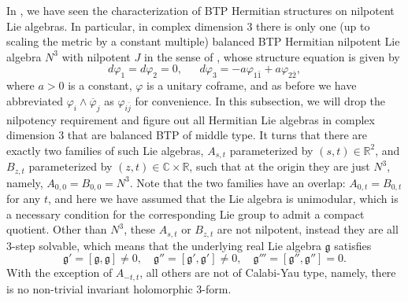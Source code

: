 \documentclass{amsart}
\numberwithin{equation}{section}
\theoremstyle{definition}
\renewcommand{\1}{\mathds{1}}
\renewcommand{\>}{\rightarrow}
\begin{document}
In \cite[Proposition 1.10]{ZhaoZ24}, we have seen the characterization of BTP Hermitian structures on nilpotent Lie algebras. In particular, in complex dimension $3$ there is only one (up to scaling the metric by a constant multiple) balanced BTP Hermitian nilpotent Lie algebra $N^3$ with nilpotent $J$ in the sense of \cite{CFGU}, whose structure equation is given by
\begin{equation} \label{nil}
d\varphi_1=d\varphi_2=0,\ \ \ \ \ \ \ d\varphi_3 = -a\varphi_{1\bar{1}} + a \varphi_{2\bar{2}},
\end{equation}
where $a>0$ is a constant, $\varphi$ is a unitary coframe, and as before we have abbreviated $\varphi_i\wedge \overline{\varphi}_j$ as  $\varphi_{i\bar{j}}$ for convenience. In this subsection, we will drop the nilpotency requirement and figure out all Hermitian Lie algebras in complex dimension $3$ that are balanced BTP of middle type. It turns that there are exactly two families of such Lie algebras, $A_{s,t}$ parameterized by $(s,t)\in {\mathbb R}^2$, and $B_{z,t}$ parameterized by $(z,t)\in {\mathbb C}\times {\mathbb R}$, such that at the origin they are just $N^3$, namely, $A_{0,0}=B_{0,0}=N^3$. Note that the two families have an overlap: $A_{0,t}=B_{0,t}$ for any $t$, and here we have assumed that the Lie algebra is unimodular, which is a necessary condition for the corresponding Lie group to admit a compact quotient. Other than $N^3$, these $A_{s,t}$ or $B_{z,t}$ are not nilpotent, instead they are all $3$-step solvable, which means that
the underlying real Lie algebra $\mathfrak{g}$ satisfies
\[\mathfrak{g}'=[\mathfrak{g},\mathfrak{g}] \neq 0,\quad \mathfrak{g}''=[\mathfrak{g}',\mathfrak{g}'] \neq 0,\quad \mathfrak{g}'''=[\mathfrak{g}'',\mathfrak{g}'']=0.\]
With the exception of $A_{-t,t}$, all others are not of Calabi-Yau type, namely, there is no non-trivial invariant holomorphic $3$-form.
\end{document}
